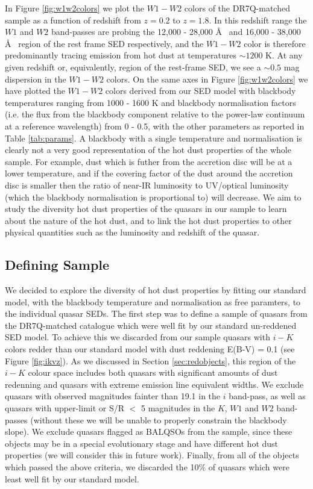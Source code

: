 In Figure \ref{fig:w1w2colors} we plot the $W1 - W2$ colors of the DR7Q-matched sample as a function of redshift from $z=0.2$ to $z=1.8$. In this redshift range the $W1$ and $W2$ band-passes are probing the 12,000 - 28,000 \AA~ and 16,000 - 38,000 \AA~ region of the rest frame SED respectively, and the $W1-W2$ color is therefore predominantly tracing emission from hot dust at temperatures $\sim 1200$ K. At any given redshift or, equivalently, region of the rest-frame SED, we see a $\sim 0.5$ mag dispersion in the $W1-W2$ colors. On the same axes in Figure \ref{fig:w1w2colors} we have plotted the $W1 - W2$ colors derived from our SED model with blackbody temperatures ranging from 1000 - 1600 K and blackbody normalisation factors (i.e. the flux from the blackbody component relative to the power-law continuum at a reference wavelength) from 0 - 0.5, with the other parameters as reported in Table \ref{tab:params}. A blackbody with a single temperature and normalisation is clearly not a very good representation of the hot dust properties of the whole sample. For example, dust which is futher from the accretion disc will be at a lower temperature, and if the covering factor of the dust around the accretion disc is smaller then the ratio of near-IR luminosity to UV/optical luminosity (which the blackbody normalisation is proportional to) will decrease. We aim to study the diversity hot dust properties of the quasars in our sample to learn about the nature of the hot dust, and to link the hot dust properties to other physical quantities such as the luminosity and redshift of the quasar. 

\subsection{Defining Sample}
\label{sec:definingsample}

We decided to explore the diversity of hot dust properties by fitting our standard model, with the blackbody temperature and normalisation as free paramters, to the individual quasar SEDs. The first step was to define a sample of quasars from the DR7Q-matched catalogue which were well fit by our standard un-reddened SED model. To achieve this we discarded from our sample quasars with $i - K$ colors redder than our standard model with dust reddening E(B-V) = 0.1 (see Figure \ref{fig:ikvz}). As we discussed in Section \ref{sec:redobjects}, this region of the $i-K$ colour space includes both quasars with significant amounts of dust redenning and quasars with extreme emission line equivalent widths. We exclude quasars with observed magnitudes fainter than 19.1 in the $i$ band-pass, as well as quasars with upper-limit or S/R $<$ 5 magnitudes in the $K$, $W1$ and $W2$ band-passes (without these we will be unable to properly constrain the blackbody slope). We exclude quasars flagged as BALQSOs from the sample, since these objects may be in a special evolutionary stage and have different hot dust properties (we will consider this in future work). Finally, from all of the objects which passed the above criteria, we discarded the 10\% of quasars which were least well fit by our standard model.   

